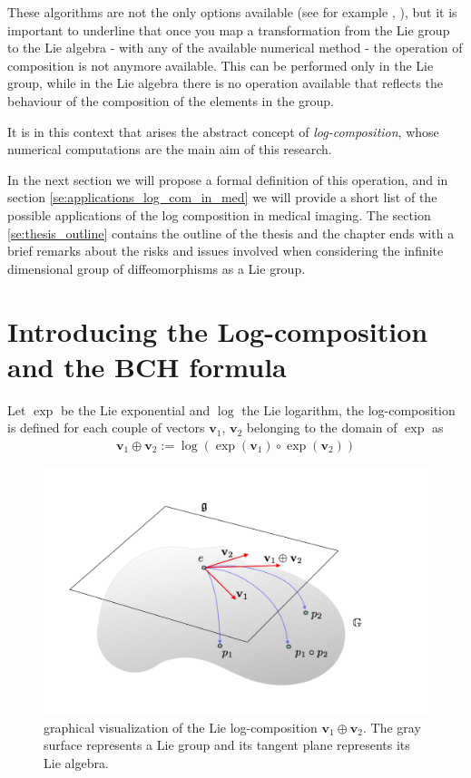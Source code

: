 These algorithms are not the only options available (see for example \cite{bossa2008algorithms}, \cite{bossa2008new}), but it is important to underline that once you map a transformation from the Lie group to the Lie algebra - with any of the available numerical method - the operation of composition is not anymore available. This can be performed only in the Lie group, while in the Lie algebra there is no operation available that reflects the behaviour of the composition of the elements in the group.

It is in this context that arises the abstract concept of \emph{log-composition}, whose numerical computations are the main aim of this research.

In the next section we will propose a formal definition of this operation, and in section \ref{se:applications_log_com_in_med} we will provide a short list of the possible applications of the log composition in medical imaging. 
The section \ref{se:thesis_outline} contains the outline of the thesis and the chapter ends with 
a brief remarks about the risks and issues involved when considering the infinite dimensional group of diffeomorphisms as a Lie group. 

\section{Introducing the Log-composition and the BCH formula}

% 
Let $\exp$ be the Lie exponential  and $\log$ the Lie logarithm, the log-composition is defined for each couple of vectors $\mathbf{v}_1$, $\mathbf{v}_2$ belonging to the domain of $\exp$ as
\begin{align}\label{eq:bch_problem}
\mathbf{v}_1 \oplus \mathbf{v}_2 := \log(\exp(\mathbf{v}_1)\circ\exp(\mathbf{v}_2))
\end{align}

\begin{figure}[!ht]
	\centering
	\includegraphics[scale=0.25]{figures/log_composition.pdf}
	\caption{graphical visualization of the Lie log-composition $\mathbf{v}_{1}\oplus \mathbf{v}_{2}$. The gray surface represents a Lie group and its tangent plane represents its Lie algebra. }
	\label{fig:composition}
\end{figure}

